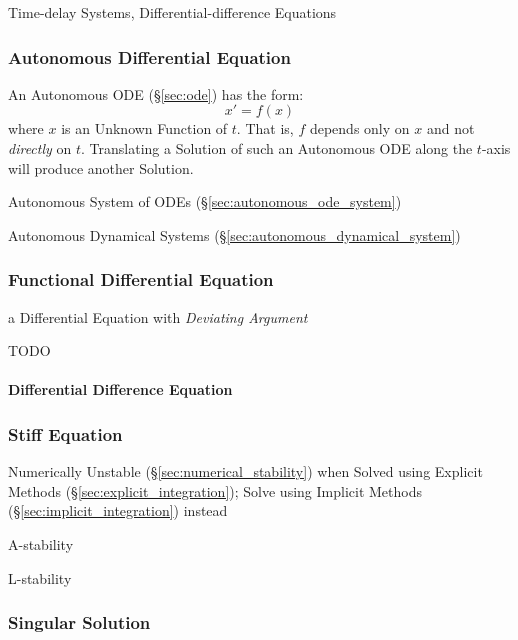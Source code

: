 {Time-delay Systems, Differential-difference Equations



\subsubsection{Autonomous Differential Equation}
\label{sec:autonomous_differential_equation}

An Autonomous ODE (\S\ref{sec:ode}) has the form:
\[
  x' = f(x)
\]
where $x$ is an Unknown Function of $t$. That is, $f$ depends only on $x$ and
not \emph{directly} on $t$. Translating a Solution of such an Autonomous ODE
along the $t$-axis will produce another Solution.

\fist Autonomous System of ODEs (\S\ref{sec:autonomous_ode_system})

\fist Autonomous Dynamical Systems (\S\ref{sec:autonomous_dynamical_system})



\subsubsection{Functional Differential Equation}\label{sec:fde}

a Differential Equation with \emph{Deviating Argument}

TODO



\paragraph{Differential Difference Equation}
\label{sec:differential_difference}\hfill



\subsubsection{Stiff Equation}\label{sec:stiff_equation}

Numerically Unstable (\S\ref{sec:numerical_stability}) when Solved using
Explicit Methods (\S\ref{sec:explicit_integration});
Solve using Implicit Methods (\S\ref{sec:implicit_integration}) instead

A-stability

L-stability



\subsubsection{Singular Solution}\label{sec:singular_solution}

}
